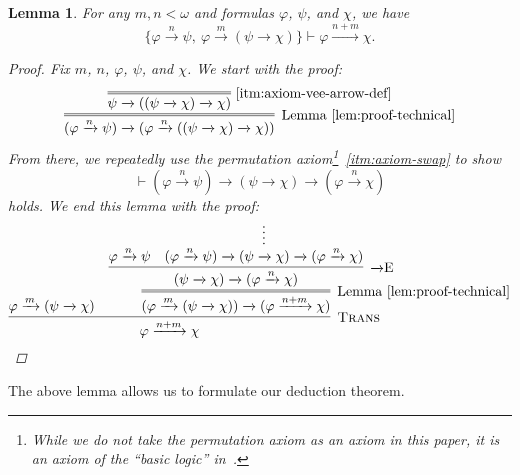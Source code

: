 \documentclass{amsart}
\newtheorem{lemma}[theorem]{Lemma}
\theoremstyle{definition}
\numberwithin{equation}{theorem}
\renewcommand{\phi}{\varphi}
\newcommand{\proves}{\vdash}
\newcommand{\narrow}[1]{\xrightarrow{#1}}
\renewcommand{\to}{\narrow{}}
\newcommand{\arr}{{\to}}
\newcommand{\elim}{\!\operatorname{E}}
\newcommand{\trans}{\text{\sc{Trans}}}
\newcommand{\aref}[1]{\!\text{\ref{itm:axiom-#1}}}
\begin{document}
\begin{lemma}\label{lem:no-contraction}
  For any $m,n<\omega$ and formulas $\phi$, $\psi$, and $\chi$, we have
  \[
    \{\phi\narrow{n}\psi,\ \phi\narrow{m}(\psi\to\chi)\}\proves\phi\narrow{n+m}\chi.
  \]
  \begin{proof}  
  Fix $m$, $n$, $\phi$, $\psi$, and $\chi$.
  We start with the proof:
  \[
    \infer=[\text{Lemma~\ref{lem:proof-technical}}]{(\phi\narrow{n}\psi)\to(\phi\narrow{n}((\psi\to\chi)\to\chi))}{
      \infer=[\aref{vee-arrow-def}]{\psi\to((\psi\to\chi)\to\chi)}{}
    }
  \]
  From there, we repeatedly use the permutation axiom\footnote{While we do not take the permutation axiom as an axiom in this paper, it is an axiom of the ``basic logic'' in~\cite{hajek1998metamathematics}.}~\ref{itm:axiom-swap} to show
  \[
    \proves (\phi\narrow{n}\psi)\to(\psi\to\chi)\to(\phi\narrow{n}\chi)
  \]
  holds.
  We end this lemma with the proof:
  \[
    \infer[\trans]{\phi\narrow{n+m}\chi}{
      \phi\narrow{m}(\psi\to\chi) &
      \infer=[\text{Lemma~\ref{lem:proof-technical}}]{(\phi\narrow{m}(\psi\to\chi))\to(\phi\narrow{n+m}\chi)}{
	      \infer[\arr\elim]{(\psi\to\chi)\to(\phi\narrow{n}\chi)}{
	        \phi\narrow{n}\psi &
	        \infer*{(\phi\narrow{n}\psi)\to(\psi\to\chi)\to(\phi\narrow{n}\chi)}{}
	      }
	    }
    }\qedhere
  \]
  \end{proof}
\end{lemma}
The above lemma allows us to formulate our deduction theorem.
\end{document}
